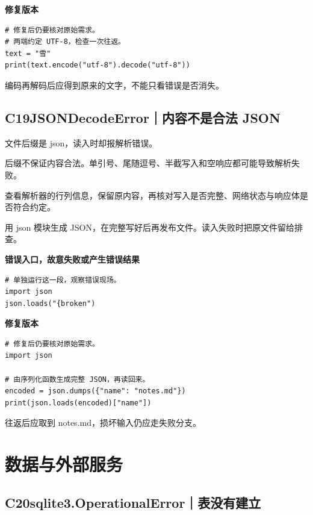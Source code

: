 \documentclass[UTF8,a4paper,oneside,openany,fontset=none,11pt]{ctexbook}
\newcommand{\code}[1]{\texttt{\detokenize{#1}}}
\newcommand{\CaseStep}[2]{\par\smallskip{\bfseries\color{Muted}#1}\enspace #2\par}
\begin{document}
\textbf{修复版本}

\begin{lstlisting}[title={\code{case_18.py}}]
# 修复后仍要核对原始需求。
# 两端约定 UTF-8，检查一次往返。
text = "雪"
print(text.encode("utf-8").decode("utf-8"))
\end{lstlisting}

\CaseStep{复验}{编码再解码后应得到原来的文字，不能只看错误是否消失。}

\subsection*{C19\enspace JSONDecodeError｜内容不是合法 JSON}

\CaseStep{现象}{文件后缀是 json，读入时却报解析错误。}

\CaseStep{原因}{后缀不保证内容合法。单引号、尾随逗号、半截写入和空响应都可能导致解析失败。}

\CaseStep{排查}{查看解析器的行列信息，保留原内容，再核对写入是否完整、网络状态与响应体是否符合约定。}

\CaseStep{修复}{用 json 模块生成 JSON，在完整写好后再发布文件。读入失败时把原文件留给排查。}

\textbf{错误入口，故意失败或产生错误结果}

\begin{lstlisting}[style=errorcode,title={错误复现（故意失败或错误结果）：\code{case_19_bad.py.txt}}]
# 单独运行这一段，观察错误现场。
import json
json.loads("{broken")
\end{lstlisting}

\textbf{修复版本}

\begin{lstlisting}[title={\code{case_19.py}}]
# 修复后仍要核对原始需求。
import json

# 由序列化函数生成完整 JSON，再读回来。
encoded = json.dumps({"name": "notes.md"})
print(json.loads(encoded)["name"])
\end{lstlisting}

\CaseStep{复验}{往返后应取到 notes.md，损坏输入仍应走失败分支。}

\section{数据与外部服务}

\subsection*{C20\enspace sqlite3.OperationalError｜表没有建立}
\end{document}
